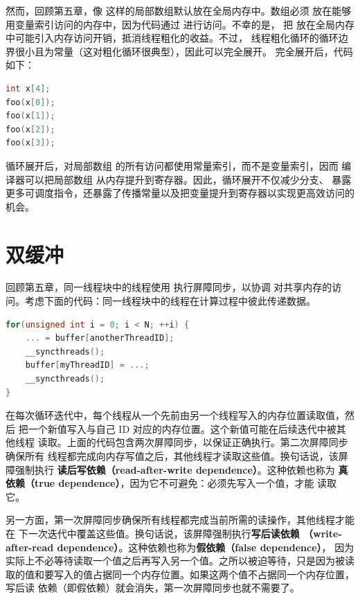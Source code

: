 然而，回顾第五章，像  这样的局部数组默认放在全局内存中。数组必须
放在能够用变量索引访问的内存中，因为代码通过  进行访问。不幸的是，
把  放在全局内存中可能引入内存访问开销，抵消线程粗化的收益。不过，
线程粗化循环的循环边界很小且为常量（这对粗化循环很典型），因此可以完全展开。
完全展开后，代码如下：

\begin{lstlisting}[language=C++]
int x[4];
foo(x[0]);
foo(x[1]);
foo(x[2]);
foo(x[3]);
\end{lstlisting}

循环展开后，对局部数组  的所有访问都使用常量索引，而不是变量索引，因而
编译器可以把局部数组  从内存提升到寄存器。因此，循环展开不仅减少分支、
暴露更多可调度指令，还暴露了传播常量以及把变量提升到寄存器以实现更高效访问的
机会。

\section{双缓冲}
\label{sec:double-buffering}

回顾第五章，同一线程块中的线程使用  执行屏障同步，以协调
对共享内存的访问。考虑下面的代码：同一线程块中的线程在计算过程中彼此传递数据。

\begin{lstlisting}[language=C++]
for(unsigned int i = 0; i < N; ++i) {
    ... = buffer[anotherThreadID];
    __syncthreads();
    buffer[myThreadID] = ...;
    __syncthreads();
}
\end{lstlisting}

在每次循环迭代中，每个线程从一个先前由另一个线程写入的内存位置读取值，然后
把一个新值写入与自己 ID 对应的内存位置。这个新值可能在后续迭代中被其他线程
读取。上面的代码包含两次屏障同步，以保证正确执行。第二次屏障同步确保所有
线程都完成向内存写值之后，其他线程才读取这些值。换句话说，该屏障强制执行
\textbf{读后写依赖（read-after-write dependence）}。这种依赖也称为
\textbf{真依赖（true dependence）}，因为它不可避免：必须先写入一个值，才能
读取它。

另一方面，第一次屏障同步确保所有线程都完成当前所需的读操作，其他线程才能在
下一次迭代中覆盖这些值。换句话说，该屏障强制执行\textbf{写后读依赖
（write-after-read dependence）}。这种依赖也称为\textbf{假依赖（false dependence）}，
因为实际上不必等待读取一个值之后再写入另一个值。之所以被迫等待，只是因为被读
取的值和要写入的值占据同一个内存位置。如果这两个值不占据同一个内存位置，写后读
依赖（即假依赖）就会消失，第一次屏障同步也就不需要了。

